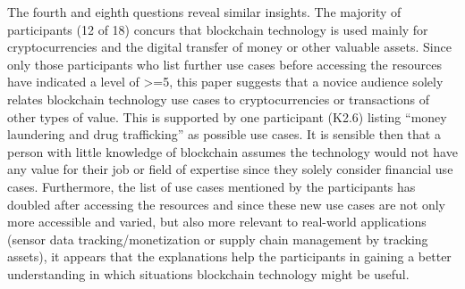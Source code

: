 The fourth and eighth questions reveal similar insights. The majority of participants (12 of 18) concurs that blockchain technology is used mainly for cryptocurrencies and the digital transfer of money or other valuable assets. Since only those participants who list further use cases before accessing the resources have indicated a level of >=5, this paper suggests that a novice audience solely relates blockchain technology use cases to cryptocurrencies or transactions of other types of value. This is supported by one participant (K2.6) listing \enquote{money laundering and drug trafficking} as possible use cases. It is sensible then that a person with little knowledge of blockchain assumes the technology would not have any value for their job or field of expertise since they solely consider financial use cases. Furthermore, the list of use cases mentioned by the participants has doubled after accessing the resources and since these new use cases are not only more accessible and varied, but also more relevant to real-world applications (sensor data tracking/monetization or supply chain management by tracking assets), it appears that the explanations help the participants in gaining a better understanding in which situations blockchain technology might be useful.

